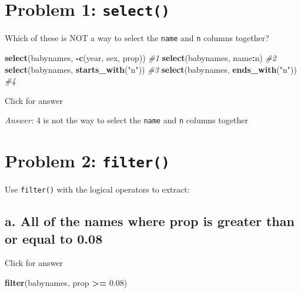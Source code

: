 \documentclass[
]{book}
\newenvironment{Shaded}{\begin{snugshade}}{\end{snugshade}}
\newcommand{\CommentTok}[1]{\textcolor[rgb]{0.56,0.35,0.01}{\textit{#1}}}
\newcommand{\FloatTok}[1]{\textcolor[rgb]{0.00,0.00,0.81}{#1}}
\newcommand{\FunctionTok}[1]{\textcolor[rgb]{0.13,0.29,0.53}{\textbf{#1}}}
\newcommand{\NormalTok}[1]{#1}
\newcommand{\SpecialCharTok}[1]{\textcolor[rgb]{0.81,0.36,0.00}{\textbf{#1}}}
\newcommand{\StringTok}[1]{\textcolor[rgb]{0.31,0.60,0.02}{#1}}
\begin{document}
\hypertarget{problem-1-select}{%
\section{\texorpdfstring{Problem 1: \texttt{select()}}{Problem 1: select()}}\label{problem-1-select}}

Which of these is NOT a way to select the \texttt{name} and \texttt{n} columns together?

\begin{Shaded}
\begin{Highlighting}[]
\FunctionTok{select}\NormalTok{(babynames, }\SpecialCharTok{{-}}\FunctionTok{c}\NormalTok{(year, sex, prop))  }\CommentTok{\#1}
\FunctionTok{select}\NormalTok{(babynames, name}\SpecialCharTok{:}\NormalTok{n)   }\CommentTok{\#2}
\FunctionTok{select}\NormalTok{(babynames, }\FunctionTok{starts\_with}\NormalTok{(}\StringTok{"n"}\NormalTok{)) }\CommentTok{\#3}
\FunctionTok{select}\NormalTok{(babynames, }\FunctionTok{ends\_with}\NormalTok{(}\StringTok{"n"}\NormalTok{))  }\CommentTok{\#4}
\end{Highlighting}
\end{Shaded}

Click for answer

\emph{Answer:} 4 is not the way to select the \texttt{name} and \texttt{n} columns together

\hypertarget{problem-2-filter}{%
\section{\texorpdfstring{Problem 2: \texttt{filter()}}{Problem 2: filter()}}\label{problem-2-filter}}

Use \texttt{filter()} with the logical operators to extract:

\hypertarget{a.-all-of-the-names-where-prop-is-greater-than-or-equal-to-0.08}{%
\subsection{a. All of the names where prop is greater than or equal to 0.08}\label{a.-all-of-the-names-where-prop-is-greater-than-or-equal-to-0.08}}

Click for answer

\begin{Shaded}
\begin{Highlighting}[]
\FunctionTok{filter}\NormalTok{(babynames, prop }\SpecialCharTok{\textgreater{}=} \FloatTok{0.08}\NormalTok{)}
\end{Highlighting}
\end{Shaded}
\end{document}
